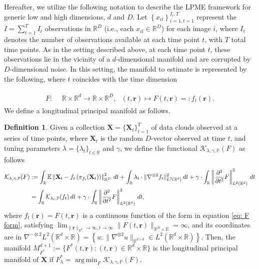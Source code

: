 \documentclass[12pt]{article}
\DeclareMathOperator*{\argmin}{arg\,min}
\theoremstyle{definition}
\newtheorem{definition}{Definition}
\begin{document}
Hereafter, we utilize the following notation to describe the LPME framework for generic low and high dimensions, $d$ and $D$. Let $\left\{x_{it}\right\}_{i=1, t=1}^{I_t, T}$ represent the $I = \sum_{t=1}^{T}I_t$ observations in $\mathbb{R}^D$ (i.e., each $x_{it}\in\mathbb{R}^D$) for each image $i$, where $I_t$ denotes the number of observations available at each time point $t$, with $T$ total time points. As in the setting described above, at each time point $t$, these observations lie in the vicinity of a $d$-dimensional manifold and are corrupted by $D$-dimensional noise. In this setting, the manifold to estimate is represented by the following, where $t$ coincides with the time dimension

\begin{align}\label{eq: F form}
    \begin{aligned}
        F:\ \ & \mathbb{R}\times\mathbb{R}^d \rightarrow \mathbb{R}\times\mathbb{R}^D,\ \ \  (t,\mathbf{r})\mapsto F(t,\mathbf{r})=:f_t(\mathbf{r}).
    \end{aligned}
\end{align}
We define a longitudinal principal manifold as follows.
\begin{definition}
  \label{def:lpme} Given a collection $\mathbf{X} = \{ \mathbf{X}_t \}_{t=1}^T$ of data clouds observed at a series of time points, where $\mathbf{X}_t$ is the random  $D$-vector observed at time $t$, and tuning parameters $\lambda=\{\lambda_t\}_{t\in\mathbb{R}}$ and $\gamma$, we define the functional $\mathcal{K}_{\lambda, \gamma, \mathbb{P}}(F)$ as follows
\begin{align}\label{eq:newKappa}
      \notag\mathcal{K}_{\lambda, \gamma, \mathbb{P}}(F) &:= \int_\mathbb{R} \mathbb{E}\left\|\mathbf{X}_t - f_t\left(\pi_{f_t}(\mathbf{X}_t)\right)\right\|_{\mathbb{R}^{D}}^2 \, dt + \int_\mathbb{R} \lambda_t \cdot\|\nabla^{\otimes 2}f_t\|_{L^2(\mathbb{R}^{d})}^2 \, dt + \gamma\cdot \int_{\mathbb{R}}\left\|\frac{\partial^2}{\partial t^2}F\right\|_{L^2(\mathbb{R}^d)}^2 \, dt \\
  &= \int_{\mathbb{R}}\mathcal{K}_{\lambda_t, \mathbb{P}}(f_t) \, dt + \gamma \cdot \int_{\mathbb{R}}\left\|\frac{\partial^2}{\partial t^2}F\right\|_{L^2(\mathbb{R}^d)}^2 \, dt,
\end{align}
\sloppy where $f_t(\mathbf{r})=F(t,\mathbf{r})$ is a continuous function of the form in equation \eqref{eq: F form}, satisfying $\lim_{\|\mathbf{r}\|_{\mathbb{R}^{d}} \to \infty, t \to \infty}\|F(t,\mathbf{r})\|_{\mathbb{R}^{D}\times\mathbb{R}} = \infty$, and its coordinates are in $\nabla^{-\otimes 2}L^2(\mathbb{R}^{d}\times\mathbb{R}) = \left\{u: \|\nabla^{\otimes 2} u\|_{\mathbb{R}^{d \times d}} \in L^2(\mathbb{R}^{d}\times\mathbb{R})\right\}$. Then, the manifold $M_{F^{*}}^{d+1}:=\{F^*(t,\mathbf{r}): (t,\mathbf{r})\in \mathbb{R}^d\times\mathbb{R}\}$ is the longitudinal principal manifold of $\mathbf{X}$ if $F_{\lambda}^{*} = \argmin_{F}\mathcal{K}_{\lambda, \gamma, \mathbb{P}}(F)$.
\end{definition}
\end{document}
